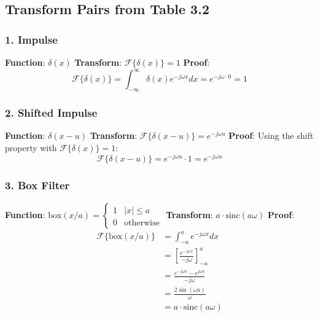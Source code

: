 \documentclass[12pt,a4paper]{article}
\begin{document}
\subsection*{Transform Pairs from Table 3.2}

\subsubsection*{1. Impulse}
\textbf{Function}: $\delta(x)$
\newline
\textbf{Transform}: $\mathcal{F}\{\delta(x)\} = 1$
\newline
\textbf{Proof}:
\begin{equation*}
\mathcal{F}\{\delta(x)\} = \int_{-\infty}^{\infty} \delta(x)e^{-j\omega x}dx = e^{-j\omega \cdot 0} = 1
\end{equation*}

\subsubsection*{2. Shifted Impulse}
\textbf{Function}: $\delta(x - u)$
\newline
\textbf{Transform}: $\mathcal{F}\{\delta(x - u)\} = e^{-j\omega u}$
\newline
\textbf{Proof}: Using the shift property with $\mathcal{F}\{\delta(x)\} = 1$:
\begin{equation*}
\mathcal{F}\{\delta(x - u)\} = e^{-j\omega u} \cdot 1 = e^{-j\omega u}
\end{equation*}

\subsubsection*{3. Box Filter}
\textbf{Function}: $\text{box}(x/a) = \begin{cases} 1 & |x| \leq a \\ 0 & \text{otherwise} \end{cases}$
\newline
\textbf{Transform}: $a \cdot \text{sinc}(a\omega)$
\newline
\textbf{Proof}:
\begin{align*}
\mathcal{F}\{\text{box}(x/a)\} &= \int_{-a}^{a} e^{-j\omega x}dx\\
&= \left[\frac{e^{-j\omega x}}{-j\omega}\right]_{-a}^{a}\\
&= \frac{e^{-j\omega a} - e^{j\omega a}}{-j\omega}\\
&= \frac{2\sin(\omega a)}{\omega} \\
&= a \cdot \text{sinc}(a\omega)
\end{align*}
\end{document}
